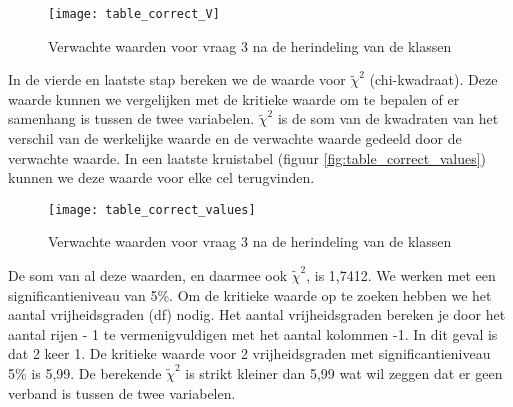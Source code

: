 \begin{figure}
	\centering
	\texttt{[image: table\_correct\_V]}
	\caption{Verwachte waarden voor vraag 3 na de herindeling van de klassen}
	\label{fig:tablecorrectV}
\end{figure}

In de vierde en laatste stap bereken we de waarde voor $\tilde\chi^2$ (chi-kwadraat). Deze waarde kunnen we vergelijken met de kritieke waarde om te bepalen of er samenhang is tussen de twee variabelen. $\tilde\chi^2$ is de som van de kwadraten van het verschil van de werkelijke waarde en de verwachte waarde gedeeld door de verwachte waarde. In een laatste kruistabel (figuur \ref{fig:table_correct_values}) kunnen we deze waarde voor elke cel terugvinden.

\begin{figure}
	\centering
	\texttt{[image: table\_correct\_values]}
	\caption{Verwachte waarden voor vraag 3 na de herindeling van de klassen}
	\label{fig:tablecorrectvalues}
\end{figure}

De som van al deze waarden, en daarmee ook $\tilde\chi^2$, is 1,7412. We werken met een significantieniveau van 5\%. Om de kritieke waarde op te zoeken hebben we het aantal vrijheidsgraden (df) nodig. Het aantal vrijheidsgraden bereken je door het aantal rijen - 1 te vermenigvuldigen met het aantal kolommen -1. In dit geval is dat 2 keer 1. De kritieke waarde voor 2 vrijheidsgraden met significantieniveau 5\% is 5,99. De berekende $\tilde\chi^2$ is strikt kleiner dan 5,99 wat wil zeggen dat er geen verband is tussen de twee variabelen.


